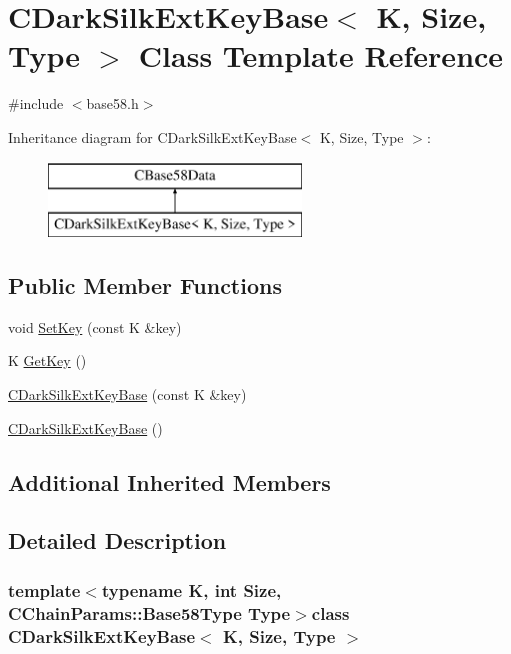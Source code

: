 \hypertarget{class_c_dark_silk_ext_key_base}{}\section{C\+Dark\+Silk\+Ext\+Key\+Base$<$ K, Size, Type $>$ Class Template Reference}
\label{class_c_dark_silk_ext_key_base}


{\ttfamily \#include $<$base58.\+h$>$}

Inheritance diagram for C\+Dark\+Silk\+Ext\+Key\+Base$<$ K, Size, Type $>$\+:\begin{figure}[H]
\begin{center}
\leavevmode
\includegraphics[height=2.000000cm]{class_c_dark_silk_ext_key_base}
\end{center}
\end{figure}
\subsection*{Public Member Functions}
\begin{DoxyCompactItemize}
\item 
void \hyperlink{class_c_dark_silk_ext_key_base_a4a9dbbdfb5a48f1c2763b26e70a6b59a}{Set\+Key} (const K \&key)
\item 
K \hyperlink{class_c_dark_silk_ext_key_base_a4215d28b3fd2a44739e9e16ac334a4be}{Get\+Key} ()
\item 
\hyperlink{class_c_dark_silk_ext_key_base_a699cf62373fd74956072b26036a84521}{C\+Dark\+Silk\+Ext\+Key\+Base} (const K \&key)
\item 
\hyperlink{class_c_dark_silk_ext_key_base_a07005d66bada4496d6f77d5f446decfa}{C\+Dark\+Silk\+Ext\+Key\+Base} ()
\end{DoxyCompactItemize}
\subsection*{Additional Inherited Members}


\subsection{Detailed Description}
\subsubsection*{template$<$typename K, int Size, C\+Chain\+Params\+::\+Base58\+Type Type$>$class C\+Dark\+Silk\+Ext\+Key\+Base$<$ K, Size, Type $>$}



